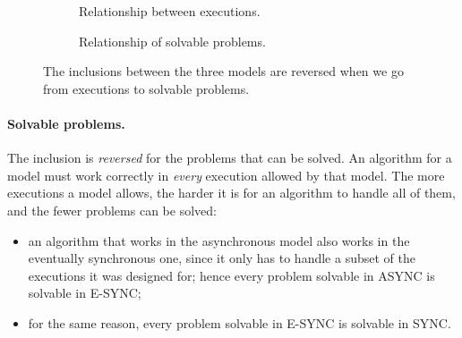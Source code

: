 \begin{figure}[H]
  \centering
  \begin{subfigure}{0.48\textwidth}
    \centering
    \caption{Relationship between executions.}
  \end{subfigure}
  \hfill
  \begin{subfigure}{0.48\textwidth}
    \centering
    \caption{Relationship of solvable problems.}
  \end{subfigure}
  \caption{The inclusions between the three models are reversed when we go from executions to solvable problems.}
  \label{fig:models-inclusion}
\end{figure}

\paragraph{Solvable problems.} The inclusion is \textit{reversed} for the problems that can be solved. An algorithm for a model must work correctly in \textit{every} execution allowed by that model. The more executions a model allows, the harder it is for an algorithm to handle all of them, and the fewer problems can be solved:
\begin{itemize}
  \item an algorithm that works in the asynchronous model also works in the eventually synchronous one, since it only has to handle a subset of the executions it was designed for; hence every problem solvable in ASYNC is solvable in E-SYNC;
  \item for the same reason, every problem solvable in E-SYNC is solvable in SYNC.
\end{itemize}

